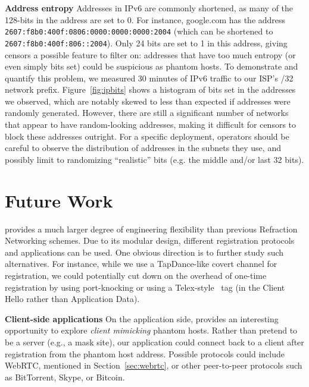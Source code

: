 \documentclass[letterpaper,twocolumn,10pt]{article}
\renewcommand{\paragraph}[1]{\smallskip\noindent\textbf{#1\quad}}
\begin{document}
\paragraph{Address entropy}
Addresses in IPv6 are commonly shortened, as many of the 128-bits in the address are set to 0.
For instance, google.com has the address
\texttt{2607:f8b0:400f:0806:0000:0000:0000:2004} (which can be shortened to
\texttt{2607:f8b0:400f:806::2004}). Only 24 bits are set to 1 in this address,
giving censors a possible feature to filter on: addresses that have too much
entropy (or even simply bits set) could be suspicious as phantom hosts. To demonstrate and quantify
this problem, we measured 30 minutes of IPv6 traffic to our ISP's /32 network prefix.
Figure~\ref{fig:ipbits} shows a histogram of bits set in the addresses we observed, which are
notably skewed to less than expected if addresses were randomly generated. However, there
are still a significant number of networks that appear to have random-looking addresses,
making it difficult for censors to block these addresses outright. For a specific deployment,
operators should be careful to observe the distribution of addresses in the subnets they use,
and possibly limit to randomizing ``realistic'' bits (e.g. the middle and/or last 32 bits).







\section{Future Work}

\scheme provides a much larger degree of engineering flexibility than previous
Refraction Networking schemes. Due to its modular design, different registration
protocols and applications can be used. One obvious direction is to further
study such alternatives. For instance, while we use a TapDance-like
covert channel for registration, we could potentially cut down on the overhead of one-time
registration by using port-knocking or using a Telex-style~\cite{telex11} tag (in the Client Hello rather than Application Data).

\paragraph{Client-side applications}
On the application side, \scheme provides an interesting opportunity to explore
\emph{client mimicking} phantom hosts. Rather than pretend to be a server (e.g.,
a mask site), our application could connect back to a client after registration
from the phantom host address. Possible protocols could include WebRTC, mentioned in
Section~\ref{sec:webrtc}, or other peer-to-peer protocols such as BitTorrent,
Skype, or Bitcoin.
\end{document}
